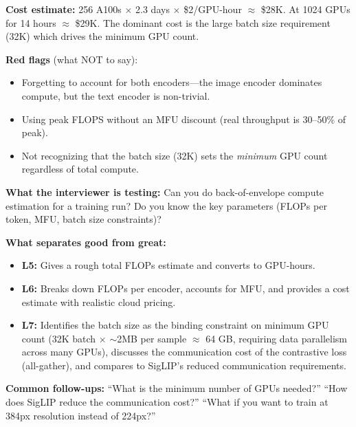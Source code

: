 \begin{interviewq}
\textbf{Cost estimate:} 256 A100s $\times$ 2.3 days $\times$ \$2/GPU-hour $\approx$ \$28K. At 1024 GPUs for 14 hours $\approx$ \$29K. The dominant cost is the large batch size requirement (32K) which drives the minimum GPU count.

\textbf{Red flags} (what NOT to say):
\begin{itemize}
    \item Forgetting to account for both encoders---the image encoder dominates compute, but the text encoder is non-trivial.
    \item Using peak FLOPS without an MFU discount (real throughput is 30--50\% of peak).
    \item Not recognizing that the batch size (32K) sets the \textit{minimum} GPU count regardless of total compute.
\end{itemize}

\textbf{What the interviewer is testing:} Can you do back-of-envelope compute estimation for a training run? Do you know the key parameters (FLOPs per token, MFU, batch size constraints)?

\textbf{What separates good from great:}
\begin{itemize}
    \item \textbf{L5:} Gives a rough total FLOPs estimate and converts to GPU-hours.
    \item \textbf{L6:} Breaks down FLOPs per encoder, accounts for MFU, and provides a cost estimate with realistic cloud pricing.
    \item \textbf{L7:} Identifies the batch size as the binding constraint on minimum GPU count (32K batch $\times$ $\sim$2MB per sample $\approx$ 64 GB, requiring data parallelism across many GPUs), discusses the communication cost of the contrastive loss (all-gather), and compares to SigLIP's reduced communication requirements.
\end{itemize}

\textbf{Common follow-ups:} ``What is the minimum number of GPUs needed?'' ``How does SigLIP reduce the communication cost?'' ``What if you want to train at 384px resolution instead of 224px?''
\end{interviewq}



